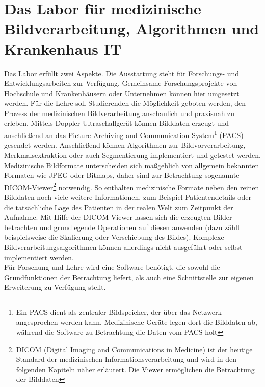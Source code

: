 \section{Das Labor für medizinische Bildverarbeitung, Algorithmen und Krankenhaus IT}\label{einleitung:labor}
Das Labor erfüllt zwei Aspekte. Die Ausstattung steht für Forschungs- und Entwicklungsarbeiten zur Verfügung. Gemeinsame Forschungsprojekte von Hochschule und Krankenhäusern oder Unternehmen können hier umgesetzt werden.
Für die Lehre soll Studierenden die Möglichkeit geboten werden, den Prozess der medizinischen Bildverarbeitung anschaulich und praxisnah zu erleben. Mittels Doppler-Ultraschallgerät können Bilddaten erzeugt und anschließend an das Picture Archiving and Communication System\footnote{Ein PACS dient als zentraler Bildspeicher, der über das Netzwerk angesprochen werden kann. Medizinische Geräte legen dort die Bilddaten ab, während die Software zu Betrachtung die Daten vom PACS holt} (PACS) gesendet werden. Anschließend können Algorithmen zur Bildvorverarbeitung, Merkmalsextraktion oder auch Segmentierung implementiert und getestet werden.\\
Medizinische Bildformate unterscheiden sich maßgeblich von allgemein bekannten Formaten wie JPEG oder Bitmaps, daher sind zur Betrachtung sogenannte DICOM-Viewer\footnote{DICOM (Digital Imaging and Communications in Medicine) ist der heutige Standard der medizinischen Informationsverarbeitung und wird in den folgenden Kapiteln näher erläutert. Die Viewer ermöglichen die Betrachtung der Bilddaten} notwendig. So enthalten medizinische Formate neben den reinen Bilddaten noch viele weitere Informationen, zum Beispiel Patientendetails oder die tatsächliche Lage des Patienten in der realen Welt zum Zeitpunkt der Aufnahme.
Mit Hilfe der DICOM-Viewer lassen sich die erzeugten Bilder betrachten und grundlegende Operationen auf diesen anwenden (dazu zählt beispielsweise die Skalierung oder Verschiebung des Bildes). Komplexe Bildverarbeitungsalgorithmen können allerdings nicht ausgeführt oder selbst implementiert werden.\\
Für Forschung und Lehre wird eine Software benötigt, die sowohl die Grundfunktionen der Betrachtung liefert, als auch eine Schnittstelle zur eigenen Erweiterung zu Verfügung stellt.

